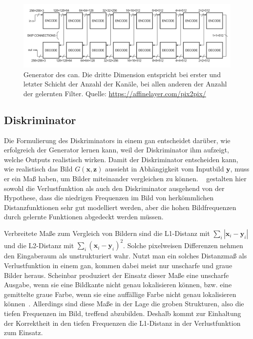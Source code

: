 \begin{figure}
	\centering
	\includegraphics[width=\linewidth]{img/can_generator}
	\caption[Generator des \gls{can}]{Generator des \gls{can}. Die dritte Dimension entspricht bei erster und letzter Schicht der Anzahl der Kanäle, bei allen anderen der Anzahl der gelernten Filter. Quelle: \url{https://affinelayer.com/pix2pix/}}
	\label{fig:cangenerator}
\end{figure}



\subsection{Diskriminator}

Die Formulierung des Diskriminators in einem \gls{gan} entscheidet darüber, wie erfolgreich der Generator lernen kann, weil der Diskriminator ihm aufzeigt, welche Outputs realistisch wirken.
Damit der Diskriminator entscheiden kann, wie realistisch das Bild $ G(\mathbf{x}, \mathbf{z}) $ aussieht in Abhängigkeit vom Inputbild $ \mathbf{y} $, muss er ein Maß haben, um Bilder miteinander vergleichen zu können.
\citeauthor{Isola.2017}~\cite{Isola.2017} gestalten hier sowohl die Verlustfunktion als auch den Diskriminator ausgehend von der Hypothese, dass die niedrigen Frequenzen im Bild von herkömmlichen Distanzfunktionen sehr gut modelliert werden, aber die hohen Bildfrequenzen durch gelernte Funktionen abgedeckt werden müssen.

Verbreitete Maße zum Vergleich von Bildern sind die L1-Distanz mit $ \sum_i | \mathbf{x}_i - \mathbf{y}_i | $ und die L2-Distanz mit $ \sum_i (\mathbf{x}_i - \mathbf{y}_i)^2 $.
Solche pixelweisen Differenzen nehmen den Eingaberaum als unstrukturiert wahr.
Nutzt man ein solches Distanzmaß als Verlustfunktion in einem \gls{gan}, kommen dabei meist nur unscharfe und graue Bilder heraus.
Scheinbar produziert der Einsatz dieser Maße eine unscharfe Ausgabe, wenn sie eine Bildkante nicht genau lokalisieren können, bzw. eine gemittelte graue Farbe, wenn sie eine auffällige Farbe nicht genau lokalisieren können~\cite{Isola.2017}.
Allerdings sind diese Maße in der Lage die groben Strukturen, also die tiefen Frequenzen im Bild, treffend abzubilden.
Deshalb kommt zur Einhaltung der Korrektheit in den tiefen Frequenzen die L1-Distanz in der Verlustfunktion zum Einsatz.

